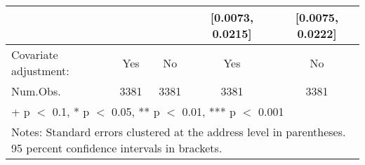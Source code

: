 \begin{table}
{\begin{tabular}[t]{lcccc}
 &  &  & {}[\num{0.0073}, \num{0.0215}] & {}[\num{0.0075}, \num{0.0222}]\\
\midrule
Covariate adjustment: & Yes & No & Yes & No\\
Num.Obs. & \num{3381} & \num{3381} & \num{3381} & \num{3381}\\
\bottomrule
\multicolumn{5}{l}{\rule{0pt}{1em}+ p $<$ 0.1, * p $<$ 0.05, ** p $<$ 0.01, *** p $<$ 0.001}\\
\multicolumn{5}{l}{\rule{0pt}{1em}Notes: Standard errors clustered at the address level in parentheses. 95 percent confidence intervals in brackets.}\\
\end{tabular}}
\end{table}
